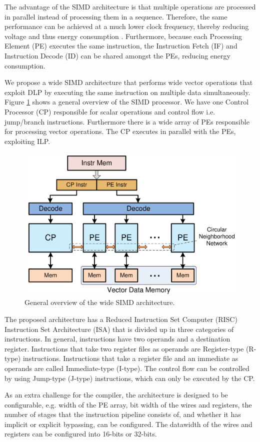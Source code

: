 The advantage of the SIMD architecture is that multiple operations are processed in parallel instead of processing them in a sequence. Therefore, the same performance can be achieved at a much lower clock frequency, thereby reducing voltage and thus energy consumption \cite{dongrio1}. Furthermore, because each Processing Element (PE) executes the same instruction, the Instruction Fetch (IF) and Instruction Decode (ID) can be shared amongst the PEs, reducing energy consumption.

We propose a wide SIMD architecture \cite{simd} that performs wide vector operations that exploit DLP by executing the same instruction on multiple data simultaneously. Figure \ref{fig:simd_overview} shows a general overview of the SIMD processor.
We have one Control Processor (CP) responsible for scalar operations and control flow i.e. jump/branch instructions. Furthermore there is a wide array of PEs responsible for processing vector operations. The CP executes in parallel with the PEs, exploiting ILP.

\begin{figure}[H]
\centering
\includegraphics[width=.6\textwidth]{figures/simd_overview}
\caption{General overview of the wide SIMD architecture.}
\label{fig:simd_overview}
\end{figure}

The proposed architecture has a Reduced Instruction Set Computer (RISC) Instruction Set Architecture (ISA) that is divided up in three categories of instructions. In general, instructions have two operands and a destination register. Instructions that take two register files as operands are Register-type (R-type) instructions. Instructions that take a register file and an immediate as operands are called Immediate-type (I-type). The control flow can be controlled by using Jump-type (J-type) instructions, which can only be executed by the CP.

As an extra challenge for the compiler, the architecture is designed to be configurable, e.g. width of the PE array, bit width of the wires and registers, the number of stages that the instruction pipeline consists of, and whether it has implicit or explicit bypassing, can be configured. The datawidth of the wires and registers can be configured into 16-bits or 32-bits.

